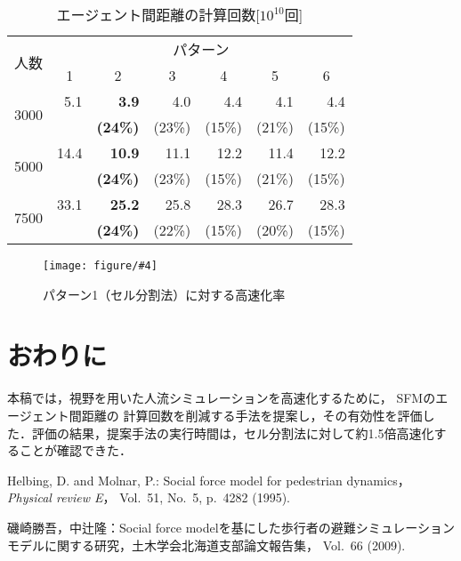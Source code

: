 \documentclass{maelab_y}
\newcommand{\figtb}[5]{ %
\begin{figure}[hbtp]
  \begin{center}
    \texttt{[image: figure/\#4]}
    \caption{#1}
    \label{fig:#5}
  \end{center}
\end{figure}
}%
\newcommand{\分類条件}{%
\begin{table}[t]
\begin{center}
\caption{進行方向を分類する条件}
\ecaption{Classification condition of moving direction $e_{i}$.}
\label{tb:hantei_jouken}
\begin{tabular}{c|c|c|c|c}
\hline \hline
			& 右 & 左 & 上 & 下 \\ \hline
パターン2   & $\frac{1}{\sqrt{2}} < e_x \leq 1  $
		    & $ -1 \leq e_x < \frac{-1}{\sqrt{2}}$ 
		    & $ \frac{-1}{\sqrt{2}} < e_x < \frac{1}{\sqrt{2}} $ 
		    & $ \frac{-1}{2} < e_x < \frac{1}{2} $ \\
パターン3   & $\frac{-1}{2} < e_y < \frac{1}{2} $ 
		    & $\frac{-1}{2} < e_y < \frac{1}{2} $
            & $ \frac{1}{\sqrt{2}} < e_y \leq 1$
		    & $ -1 \leq e_y < \frac{-1}{\sqrt{2}} $ \\
\hline
\multirow{2}{*}{パターン4}   
			& $R_x \geq A_x$ & $R_x < A_x$ & $R_y \geq A_y$ & $R_y < A_y $ \\
	        &  $L_x \geq A_x$ & $L_x < A_x$ & $L_y \geq A_y$ & $L_y < A_y$ \\
\hline
\multirow{2}{*}{パターン5}   
 			& $R_x \geq x_1$ & $R_x < x_2$ & $R_y \geq y_1$ & $R_y < y_2 $ \\
			& $L_x \geq x_1$ & $L_x < x_2$ & $L_y \geq y_1$ & $L_y < y_2 $ \\
\hline
パターン6   & $ \cos(\frac{1}{2}\theta_{view}) \leq  e_y $ 
			& $ e_y \leq -\cos(\frac{1}{2}\theta_{view})$ 
			& $ \sin(\frac{1}{2}(\pi - \theta_{view})) \leq e_x $ 
			& $ e_x \leq \sin(\frac{1}{2}(\pi - \theta_{view}))  $ \\
\hline
\end{tabular}
\end{center}
\end{table}}%
\newcommand{\距離計算new}{%
  \begin{table}[hbtp]
    \begin{center}
    \caption{エージェント間距離の計算回数[$10^{10}$回]}
    \label{tab:my-table}
    \begin{tabular}{c|llllll}
    \hline \hline
    \multirow{2}{*}{人数}   & \multicolumn{6}{c}{パターン}                                                                                                                                                             \\ \cline{2-7} 
                          & \multicolumn{1}{c|}{1}    & \multicolumn{1}{c|}{2}               & \multicolumn{1}{c|}{3}      & \multicolumn{1}{c|}{4}      & \multicolumn{1}{c|}{5}      & \multicolumn{1}{c}{6}    \\ \hline
    \multirow{2}{*}{3000} & \multicolumn{1}{r|}{5.1}  & \multicolumn{1}{r|}{\textbf{3.9}}    & \multicolumn{1}{r|}{4.0}    & \multicolumn{1}{r|}{4.4}    & \multicolumn{1}{r|}{4.1}    & \multicolumn{1}{r}{4.4}  \\
                          & \multicolumn{1}{l|}{}     & \multicolumn{1}{l|}{\textbf{(24\%)}} & \multicolumn{1}{l|}{(23\%)} & \multicolumn{1}{l|}{(15\%)} & \multicolumn{1}{l|}{(21\%)} & (15\%)                   \\ \hline
    \multirow{2}{*}{5000} & \multicolumn{1}{r|}{14.4} & \multicolumn{1}{r|}{\textbf{10.9}}   & \multicolumn{1}{r|}{11.1}   & \multicolumn{1}{r|}{12.2}   & \multicolumn{1}{r|}{11.4}   & \multicolumn{1}{r}{12.2} \\
                          & \multicolumn{1}{l|}{}     & \multicolumn{1}{l|}{\textbf{(24\%)}} & \multicolumn{1}{l|}{(23\%)} & \multicolumn{1}{l|}{(15\%)} & \multicolumn{1}{l|}{(21\%)} & (15\%)                   \\ \hline
    \multirow{2}{*}{7500} & \multicolumn{1}{r|}{33.1} & \multicolumn{1}{r|}{\textbf{25.2}}   & \multicolumn{1}{r|}{25.8}   & \multicolumn{1}{r|}{28.3}   & \multicolumn{1}{r|}{26.7}   & \multicolumn{1}{r}{28.3} \\
                          & \multicolumn{1}{l|}{}     & \multicolumn{1}{l|}{\textbf{(24\%)}} & \multicolumn{1}{l|}{(22\%)} & \multicolumn{1}{l|}{(15\%)} & \multicolumn{1}{l|}{(20\%)} & (15\%)                   \\ \hline
    \end{tabular}
    \end{center}
    \end{table}
}%
\newcommand{\粒子数}{%
\begin{table}[hbtp]
  \begin{center}
    \caption{各配置の詳細}
    \label{tb:haichi_para}
    \begin{tabular}{c|c|c}
      \hline \hline
      & 教室 & 演習室 \\ \hline 
      エージェント数[人] & 96 & 204 \\ \hline
      壁粒子数[個] & 1037 & 1454\\ \hline
      経由地数[個] & 12   & 26 \\ \hline
      解析領域 & $50m\times50m$ & $50m\times50m$ \\ \hline
    \end{tabular}
  \end{center}
\end{table}
}%
\newcommand{\評価環境}{%
\begin{table}[hbtp]
  \begin{center}
    \caption{各配置の詳細}
    \label{tb:haichi_para}
    \begin{tabular}{c|c|c}
      \hline \hline
                 & マシン1                & マシン2 \\ \hline 
      CPU        & Intel Xeon E5-2687W & Intel Xeon E5-2667W \\ \hline
      メモリ     & 64GB                   & 64GB \\ \hline
      OS         & Linux 4.12.9            & Linux 6.5.8 \\ \hline
      コンパイラ & gcc 7.2.0             & gcc 13.2.0 \\ \hline
    \end{tabular}
  \end{center}
\end{table}
}%
\begin{document}
\距離計算new
\figtb{パターン1（セル分割法）に対する高速化率}{}{8}{20230226_kousokuka.eps}{kousokuka2}

\section{おわりに}
本稿では，視野を用いた人流シミュレーションを高速化するために，
SFMのエージェント間距離の
計算回数を削減する手法を提案し，その有効性を評価した．評価の結果，提案手法の実行時間は，セル分割法に対して約1.5倍高速化することが確認できた．

\begin{thebibliography}{9}
\footnotesize
{}
  Helbing, D. and Molnar, P.: Social force model for pedestrian dynamics，{\em
    Physical review E}， Vol.~51, No.~5, p.\ 4282 (1995).

  磯崎勝吾，中辻隆：Social force
  modelを基にした歩行者の避難シミュレーションモデルに関する研究，土木学会北海道支部論文報告集，
  Vol.~66 (2009).
\end{thebibliography}
\end{document}
